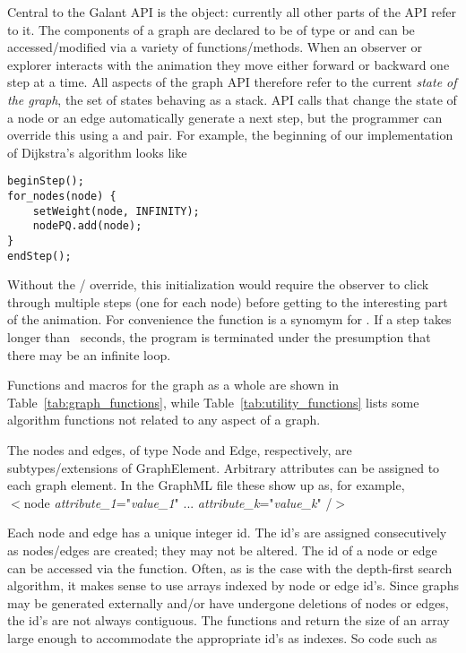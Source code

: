 Central to the Galant API is the  object: currently all other
parts of the API refer to it.
The components of a graph are declared to be of type  or
 and can be accessed/modified via a variety of
functions/methods.
When an observer or explorer interacts with the animation they move either
forward or backward one step at a time.
All aspects of the graph API therefore refer to the current \emph{state of
  the graph}, the set of states behaving as a stack.
API calls that change the state of a node or an edge automatically
generate a next step,
but the programmer can override this using a  and
 pair. For example, the beginning of our implementation of
Dijkstra's algorithm looks like
\begin{verbatim}
beginStep();
for_nodes(node) {
    setWeight(node, INFINITY);
    nodePQ.add(node);
}
endStep();
\end{verbatim}
Without the /
override, this initialization would require the observer to click
through multiple steps (one for each node) before getting to the interesting
part of the animation.
For convenience the function  is a synomym for .
If a step takes longer than \Timeout\ seconds, the program is terminated
under the presumption that there may be an infinite loop.





Functions and macros for the graph as a whole are shown in Table~\ref{tab:graph_functions}, while Table~\ref{tab:utility_functions} lists some algorithm functions not related to any aspect of a graph.

The nodes and edges, of type \textsf{Node} and \textsf{Edge}, respectively,
are subtypes/extensions of \textsf{GraphElement}.
Arbitrary attributes can be assigned to each graph element. In the GraphML file
these show up as, for example,\\
\hspace*{3em}
\textsf{
$<$node \emph{attribute\_1}="\emph{value\_1}" ... \emph{attribute\_k}="\emph{value\_k}" /$>$
}

Each node and edge has a unique integer id.
The id's are assigned consecutively as nodes/edges are created;
they may not be altered.
The id of a node or edge can be accessed via the  function.
Often, as is the case with the depth-first search algorithm, it makes sense to use
arrays indexed by node or edge id's.
Since graphs may be generated externally and/or have undergone deletions of nodes or
edges, the id's are not always contiguous.
The functions  and  return the size of an array
large enough to accommodate the appropriate id's as indexes. So code such as

